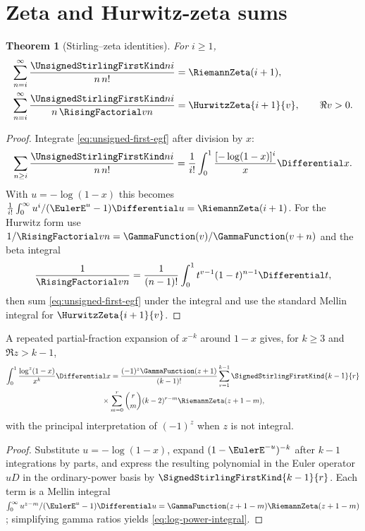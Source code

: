 \documentclass[11pt,a4paper,oneside,openany]{book}
\newtheorem{theorem}{Theorem}[chapter]
\theoremstyle{definition}
\theoremstyle{remark}
\begin{document}
\section{Zeta and Hurwitz-zeta sums}
\begin{theorem}[Stirling--zeta identities]\label{thm:stirling-zeta}
For $i\ge1$,
\begin{align}
 \sum_{n=i}^\infty\frac{\UnsignedStirlingFirstKind ni}{n\,n!}&=\RiemannZeta(i+1),
 \label{eq:first-zeta}\\
 \sum_{n=i}^\infty\frac{\UnsignedStirlingFirstKind ni}{n\,\RisingFactorial v n}&=\HurwitzZeta{i+1}{v},
 \qquad \Re v>0.\label{eq:first-hurwitz}
\end{align}
\end{theorem}
\begin{proof}
Integrate \cref{eq:unsigned-first-egf} after division by $x$:
\[
 \sum_{n\ge i}\frac{\UnsignedStirlingFirstKind ni}{n\,n!}
 =\frac1{i!}\int_0^1\frac{[-\log(1-x)]^i}{x}\Differential x.
\]
With $u=-\log(1-x)$ this becomes
$\frac1{i!}\int_0^\infty u^i/(\EulerE^u-1)\Differential u=\RiemannZeta(i+1)$.
For the Hurwitz form use
$1/\RisingFactorial v n=\GammaFunction(v)/\GammaFunction(v+n)$ and the beta integral
\[
 \frac1{\RisingFactorial v n}=\frac1{(n-1)!}\int_0^1t^{v-1}(1-t)^{n-1}\Differential t,
\]
then sum \cref{eq:unsigned-first-egf} under the integral and use the standard
Mellin integral for $\HurwitzZeta{i+1}{v}$.
\end{proof}

A repeated partial-fraction expansion of $x^{-k}$ around $1-x$ gives, for
$k\ge3$ and $\Re z>k-1$,
\begin{multline}\label{eq:log-power-integral}
 \int_0^1\frac{\log^z(1-x)}{x^k}\Differential x
 =\frac{(-1)^z\GammaFunction(z+1)}{(k-1)!}
 \sum_{r=1}^{k-1}\SignedStirlingFirstKind{k-1}{r}\\
 {}\times\sum_{m=0}^r\binom rm(k-2)^{r-m}\RiemannZeta(z+1-m),
\end{multline}
with the principal interpretation of $(-1)^z$ when $z$ is not integral.
\begin{proof}
Substitute $u=-\log(1-x)$, expand
$(1-\EulerE^{-u})^{-k}$ after $k-1$ integrations by parts, and express the resulting
polynomial in the Euler operator $uD$ in the ordinary-power basis by
$\SignedStirlingFirstKind{k-1}{r}$.  Each term is a Mellin integral
$\int_0^\infty u^{z-m}/(\EulerE^u-1)\Differential u=\GammaFunction(z+1-m)\RiemannZeta(z+1-m)$; simplifying gamma
ratios yields \cref{eq:log-power-integral}.
\end{proof}
\end{document}
